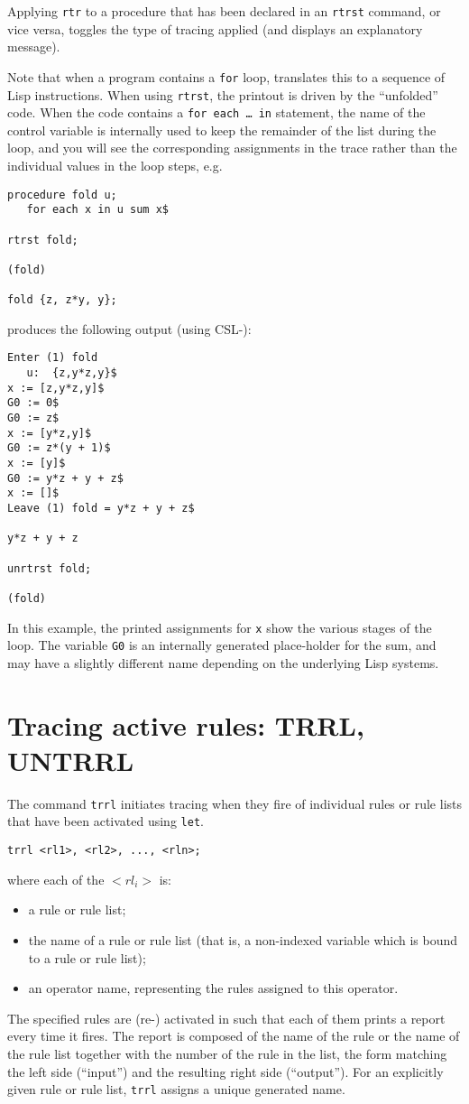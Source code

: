 \documentclass[11pt,a4paper]{article}
\begin{document}
Applying \texttt{rtr} to a procedure that has been declared in an
\texttt{rtrst} command, or vice versa, toggles the type of tracing
applied (and displays an explanatory message).

Note that when a program contains a \texttt{for} loop, \REDUCE{}
translates this to a sequence of Lisp instructions.  When using
\texttt{rtrst}, the printout is driven by the ``unfolded'' code.  When
the code contains a \texttt{for each \ldots{} in} statement, the name
of the control variable is internally used to keep the remainder of
the list during the loop, and you will see the corresponding
assignments in the trace rather than the individual values in the loop
steps, e.g.
\begin{verbatim}
procedure fold u;
   for each x in u sum x$

rtrst fold;

(fold)

fold {z, z*y, y};
\end{verbatim}
produces the following output (using CSL-\REDUCE{}):
\begin{verbatim}
Enter (1) fold
   u:  {z,y*z,y}$
x := [z,y*z,y]$
G0 := 0$
G0 := z$
x := [y*z,y]$
G0 := z*(y + 1)$
x := [y]$
G0 := y*z + y + z$
x := []$
Leave (1) fold = y*z + y + z$

y*z + y + z

unrtrst fold;

(fold)
\end{verbatim}
In this example, the printed assignments for \texttt{x} show the
various stages of the loop.  The variable \texttt{G0} is an internally
generated place-holder for the sum, and may have a slightly different
name depending on the underlying Lisp systems.

\section{Tracing active rules: TRRL, UNTRRL}

The command \texttt{trrl} initiates tracing when they fire of
individual rules or rule lists that have been activated using
\texttt{let}.
\begin{verbatim}
trrl <rl1>, <rl2>, ..., <rln>;
\end{verbatim}
where each of the $<rl_i>$ is:
\begin{itemize}
\item a rule or rule list;
\item the name of a rule or rule list (that is, a non-indexed variable
      which is bound to a rule or rule list);
\item an operator name, representing the rules assigned to this
      operator.
\end{itemize}
The specified rules are (re-) activated in \REDUCE{} such that each of
them prints a report every time it fires.  The report is composed of
the name of the rule or the name of the rule list together with the
number of the rule in the list, the form matching the left side
(``input'') and the resulting right side (``output'').  For an
explicitly given rule or rule list, \texttt{trrl} assigns a unique
generated name.
\end{document}
